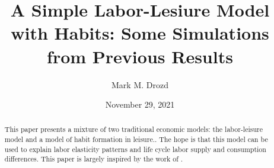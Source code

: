 \documentclass[ProjectMMD]{subfiles}
\begin{document}
\providecommand{\versn}{pdf} %
\ifthenelse{\boolean{Web}}{    %
  \renewcommand{\versn}{Web}     %
  \renewcommand{\rootFromOut}{.} %
}{}  %


\title{A Simple Labor-Lesiure Model with Habits: Some Simulations from Previous Results }

\author{Mark M. Drozd \authNum}


\renewcommand{\forcedate}{November 29, 2021}\date{\forcedate}

\maketitle
\hypertarget{abstract}{}
\begin{abstract}
  This paper presents a mixture of two traditional economic models: the labor-leisure model and a model of habit formation in leisure.. The hope is that this model can be used to explain labor elasticity patterns and life cycle labor supply and consumption differences. This paper is largely inspired by the work of \cite{bover1991relaxing}.
\end{abstract}


\hypertarget{links}{}
\end{document}
